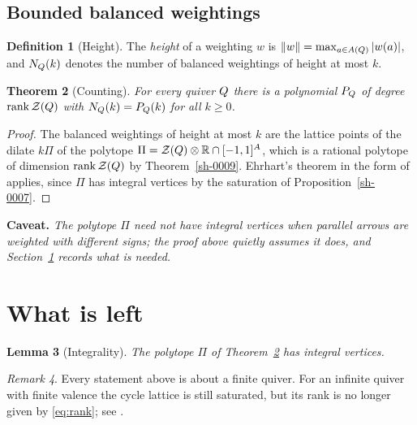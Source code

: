 \documentclass[11pt]{amsart}
\theoremstyle{plain}
\newtheorem{theorem}{Theorem}[section]
\newtheorem{lemma}[theorem]{Lemma}
\theoremstyle{definition}
\newtheorem{definition}[theorem]{Definition}
\theoremstyle{remark}
\newtheorem{remark}[theorem]{Remark}
\newenvironment{caveat}{\par\medskip\noindent\textbf{Caveat.}\begingroup\itshape}{\endgroup\par\medskip}
\begin{document}
\subsection{Bounded balanced weightings}\label{sh-0301}

\begin{definition}[Height]\label{sh-000B}
The \emph{height} of a weighting $w$ is $\|w\| = \max_{a \in A(Q)} |w(a)|$, and $N_{Q}(k)$ denotes the number of balanced weightings of height at most $k$.
\end{definition}

\begin{theorem}[Counting]\label{sh-000C}
For every quiver $Q$ there is a polynomial $P_{Q}$ of degree $\operatorname{rank} \mathcal{Z}(Q)$ with $N_{Q}(k) = P_{Q}(k)$ for all $k \geq 0$.
\end{theorem}
\begin{proof}
The balanced weightings of height at most $k$ are the lattice points of the dilate $k \Pi$ of the polytope $\Pi = \mathcal{Z}(Q) \otimes \mathbb{R} \cap [-1,1]^{A}$, which is a rational polytope of dimension $\operatorname{rank} \mathcal{Z}(Q)$ by Theorem~\ref{sh-0009}. Ehrhart's theorem in the form of \cite[Theorem 3.2]{Bellamy19} applies, since $\Pi$ has integral vertices by the saturation of Proposition~\ref{sh-0007}.
\end{proof}

\begin{caveat}\label{sh-000D}
The polytope $\Pi$ need not have integral vertices when parallel arrows are weighted with different signs; the proof above quietly assumes it does, and Section~\ref{sh-0400} records what is needed.
\end{caveat}

\section{What is left}\label{sh-0400}

\begin{lemma}[Integrality]\label{sh-000E}
The polytope $\Pi$ of Theorem~\ref{sh-000C} has integral vertices.
\end{lemma}

\begin{remark}\label{sh-000F}
Every statement above is about a finite quiver. For an infinite quiver with finite valence the cycle lattice is still saturated, but its rank is no longer given by \eqref{eq:rank}; see \cite{Cortez07}.
\end{remark}



\end{document}
